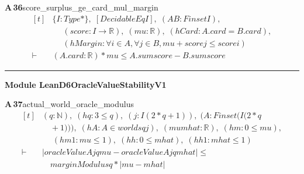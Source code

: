 \documentclass[conference]{IEEEtran}
\theoremstyle{definition}
\newcommand{\lean}[1]{\textsf{\footnotesize #1}}
\begin{document}
\noindent\textbf{A\,36}\quad\lean{score\_surplus\_ge\_card\_mul\_margin}
{\footnotesize\[ \begin{aligned}[t]
&\{ \mathit{I} : \mathit{Type}*\},\; [\mathit{DecidableEq} \mathit{I}],\; (\mathit{A} \mathit{B} : \mathit{Finset} \mathit{I}),\\
&\quad \; (\mathit{score} : \mathit{I} \to \mathbb{R} ),\; (\mathit{mu} : \mathbb{R} ),\; (\mathit{hCard} : \mathit{A}.\mathit{card} = \mathit{B}.\mathit{card}),\\
&\quad \; (\mathit{hMargin} : \forall \mathit{i} \in \mathit{A}, \forall \mathit{j} \in \mathit{B}, \mathit{mu} + \mathit{score} \mathit{j} \leq \mathit{score} \mathit{i})\\
\vdash\;&(\mathit{A}.\mathit{card} : \mathbb{R} ) * \mathit{mu} \leq \mathit{A}.\mathit{sum} \mathit{score} - \mathit{B}.\mathit{sum} \mathit{score}
\end{aligned} \]}

\vspace{4pt}\noindent\rule{\columnwidth}{0.4pt}\par\vspace{2pt}
\noindent\textbf{Module \lean{LeanD6OracleValueStabilityV1}}\par\vspace{3pt}

\noindent\textbf{A\,37}\quad\lean{actual\_world\_oracle\_modulus}
{\footnotesize\[ \begin{aligned}[t]
&(\mathit{q} : \mathbb{N} ),\; (\mathit{hq} : 3 \leq \mathit{q}),\; (\mathit{j} : \mathit{I} (2*\mathit{q}+1)),\; (\mathit{A} : \mathit{Finset} (\mathit{I} (2*\mathit{q}\\
&\quad +1))),\; (\mathit{hA} : \mathit{A} \in \mathit{worlds} \mathit{q} \mathit{j}),\; (\mathit{mu} \mathit{mhat} : \mathbb{R} ),\; (\mathit{hm} : 0 \leq \mathit{mu}),\\
&\quad \; (\mathit{hm1} : \mathit{mu} \leq 1),\; (\mathit{hh} : 0 \leq \mathit{mhat}),\; (\mathit{hh1} : \mathit{mhat} \leq 1)\\
\vdash\;&|\mathit{oracleValue} \mathit{A} \mathit{j} \mathit{q} \mathit{mu}-\mathit{oracleValue} \mathit{A} \mathit{j} \mathit{q} \mathit{mhat}| \leq\\
&\quad \mathit{marginModulus} \mathit{q}*|\mathit{mu}-\mathit{mhat}|
\end{aligned} \]}
\end{document}
